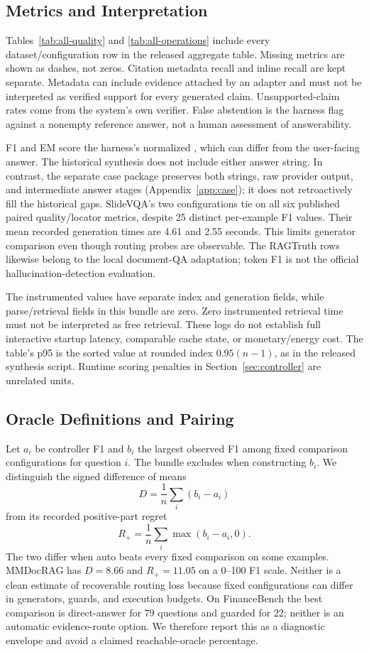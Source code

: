 \subsection{Metrics and Interpretation}
Tables~\ref{tab:all-quality} and \ref{tab:all-operations} include every dataset/configuration row in the released aggregate table. Missing metrics are shown as dashes, not zeros. Citation metadata recall and inline recall are kept separate. Metadata can include evidence attached by an adapter and must not be interpreted as verified support for every generated claim. Unsupported-claim rates come from the system's own verifier. False abstention is the harness flag against a nonempty reference answer, not a human assessment of answerability.

F1 and EM score the harness's normalized , which can differ from the user-facing answer. The historical synthesis does not include either answer string. In contrast, the separate case package preserves both strings, raw provider output, and intermediate answer stages (Appendix~\ref{app:case}); it does not retroactively fill the historical gaps. SlideVQA's two configurations tie on all six published paired quality/locator metrics, despite 25 distinct per-example F1 values. Their mean recorded generation times are 4.61 and 2.55 seconds. This limits generator comparison even though routing probes are observable. The RAGTruth rows likewise belong to the local document-QA adaptation; token F1 is not the official hallucination-detection evaluation.

The instrumented  values have separate index and generation fields, while parse/retrieval fields in this bundle are zero. Zero instrumented retrieval time must not be interpreted as free retrieval. These logs do not establish full interactive startup latency, comparable cache state, or monetary/energy cost. The table's p95 is the sorted value at rounded index $0.95(n-1)$, as in the released synthesis script. Runtime scoring penalties in Section~\ref{sec:controller} are unrelated units.



\subsection{Oracle Definitions and Pairing}
Let $a_i$ be controller F1 and $b_i$ the largest observed F1 among fixed comparison configurations for question $i$. The bundle excludes  when constructing $b_i$. We distinguish the signed difference of means
\[
 D=\frac1n\sum_i(b_i-a_i)
\]
from its recorded positive-part regret
\[
 R_+=\frac1n\sum_i\max(b_i-a_i,0).
\]
The two differ when auto beats every fixed comparison on some examples. MMDocRAG has $D=8.66$ and $R_+=11.05$ on a 0--100 F1 scale. Neither is a clean estimate of recoverable routing loss because fixed configurations can differ in generators, guards, and execution budgets. On FinanceBench the best comparison is direct-answer for 79 questions and guarded for 22; neither is an automatic evidence-route option. We therefore report this as a diagnostic envelope and avoid a claimed reachable-oracle percentage.

